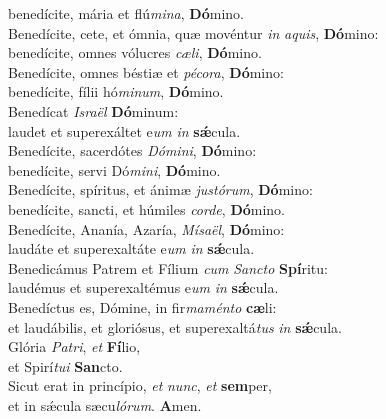 \evenverse benedícite, mária et flú\textit{mi}\textit{na}, \textbf{Dó}mino.\\
\oddverse Benedícite, cete, et ómnia, quæ movéntur \textit{in} \textit{a}\textit{quis}, \textbf{Dó}mino:~\*\\
\oddverse benedícite, omnes vólucres \textit{cæ}\textit{li}, \textbf{Dó}mino.\\
\evenverse Benedícite, omnes béstiæ et \textit{pé}\textit{co}\textit{ra}, \textbf{Dó}mino:~\*\\
\evenverse benedícite, fílii hó\textit{mi}\textit{num}, \textbf{Dó}mino.\\
\oddverse Benedícat \textit{Is}\textit{ra}\textit{ël} \textbf{Dó}minum:~\*\\
\oddverse laudet et superexáltet e\textit{um} \textit{in} \textbf{sǽ}cula.\\
\evenverse Benedícite, sacerdótes \textit{Dó}\textit{mi}\textit{ni}, \textbf{Dó}mino:~\*\\
\evenverse benedícite, servi Dó\textit{mi}\textit{ni}, \textbf{Dó}mino.\\
\oddverse Benedícite, spíritus, et ánimæ \textit{ju}\textit{stó}\textit{rum}, \textbf{Dó}mino:~\*\\
\oddverse benedícite, sancti, et húmiles \textit{cor}\textit{de}, \textbf{Dó}mino.\\
\evenverse Benedícite, Ananía, Azaría, \textit{Mí}\textit{sa}\textit{ël}, \textbf{Dó}mino:~\*\\
\evenverse laudáte et superexaltáte e\textit{um} \textit{in} \textbf{sǽ}cula.\\
\oddverse Benedicámus Patrem et Fílium \textit{cum} \textit{San}\textit{cto} \textbf{Spí}ritu:~\*\\
\oddverse laudémus et superexaltémus e\textit{um} \textit{in} \textbf{sǽ}cula.\\
\evenverse Benedíctus es, Dómine, in fir\textit{ma}\textit{mén}\textit{to} \textbf{cæ}li:~\*\\
\evenverse et laudábilis, et gloriósus, et superexaltá\textit{tus} \textit{in} \textbf{sǽ}cula.\\
\oddverse Glória \textit{Pa}\textit{tri}, \textit{et} \textbf{Fí}lio,~\*\\
\oddverse et Spirí\textit{tu}\textit{i} \textbf{San}cto.\\
\evenverse Sicut erat in princípio, \textit{et} \textit{nunc}, \textit{et} \textbf{sem}per,~\*\\
\evenverse et in sǽcula sæcu\textit{ló}\textit{rum}. \textbf{A}men.\\
